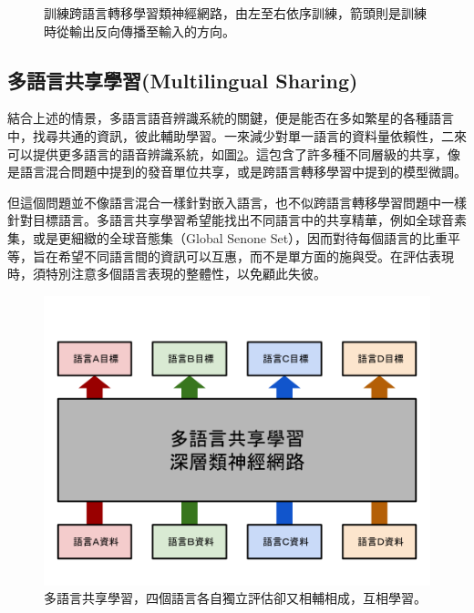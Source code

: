 \begin{figure}
\caption{訓練跨語言轉移學習類神經網路，由左至右依序訓練，箭頭則是訓練時從輸出反向傳播至輸入的方向。}
\label{fig:chap2_cross}
\end{figure}


\subsection{多語言共享學習(Multilingual Sharing)}
結合上述的情景，多語言語音辨識系統的關鍵，便是能否在多如繁星的各種語言中，找尋共通的資訊，彼此輔助學習。一來減少對單一語言的資料量依賴性，二來可以提供更多語言的語音辨識系統，如圖\ref{fig:chap2_multilingual}。這包含了許多種不同層級的共享，像是語言混合問題中提到的發音單位共享，或是跨語言轉移學習中提到的模型微調。

但這個問題並不像語言混合一樣針對嵌入語言，也不似跨語言轉移學習問題中一樣針對目標語言。多語言共享學習希望能找出不同語言中的共享精華，例如全球音素集，或是更細緻的全球音態集（Global Senone Set），因而對待每個語言的比重平等，旨在希望不同語言間的資訊可以互惠，而不是單方面的施與受。在評估表現時，須特別注意多個語言表現的整體性，以免顧此失彼。

\begin{figure}
\centering
\includegraphics[scale=0.4]{images/chap2_multilingual}
\caption{多語言共享學習，四個語言各自獨立評估卻又相輔相成，互相學習。}
\label{fig:chap2_multilingual}
\end{figure}
